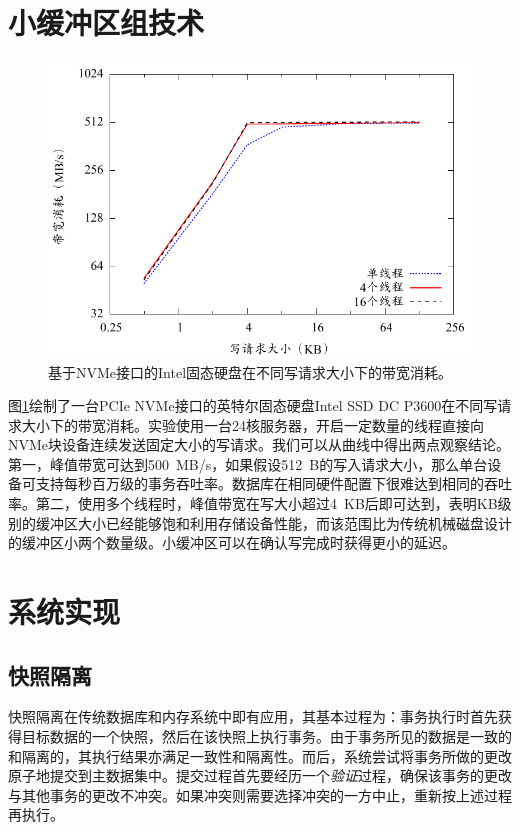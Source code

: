 \section{小缓冲区组技术}

\begin{figure}[t]
\centering
\includegraphics[width=0.9\columnwidth]{figures/nvme-bandwidth}
\caption{基于NVMe接口的Intel固态硬盘在不同写请求大小下的带宽消耗。}
\label{fig-nvme-bandwidth}
\end{figure}

图\ref{fig-nvme-bandwidth}绘制了一台PCIe NVMe接口的英特尔固态硬盘Intel SSD DC P3600在不同写请求大小下的带宽消耗。实验使用一台24核服务器，开启一定数量的线程直接向NVMe块设备连续发送固定大小的写请求。我们可以从曲线中得出两点观察结论。第一，峰值带宽可达到500~MB/s，如果假设512~B的写入请求大小，那么单台设备可支持每秒百万级的事务吞吐率。数据库在相同硬件配置下很难达到相同的吞吐率。第二，使用多个线程时，峰值带宽在写大小超过4~KB后即可达到，表明KB级别的缓冲区大小已经能够饱和利用存储设备性能，而该范围比为传统机械磁盘设计的缓冲区小两个数量级。小缓冲区可以在确认写完成时获得更小的延迟。

\section{系统实现}

\subsection{快照隔离}
\label{subsec:sba-si}

快照隔离在传统数据库和内存系统中即有应用\cite{Daudjee:2006:LDR:1182635.1164189, Fekete:2005:MSI:1071610.1071615, Ports:2012:SSI:2367502.2367523, Litz:2014:SRT:2541940.2541952}，其基本过程为：事务执行时首先获得目标数据的一个快照，然后在该快照上执行事务。由于事务所见的数据是一致的和隔离的，其执行结果亦满足一致性和隔离性。而后，系统尝试将事务所做的更改原子地提交到主数据集中。提交过程首先要经历一个\emph{验证}过程，确保该事务的更改与其他事务的更改不冲突。如果冲突则需要选择冲突的一方中止，重新按上述过程再执行。

